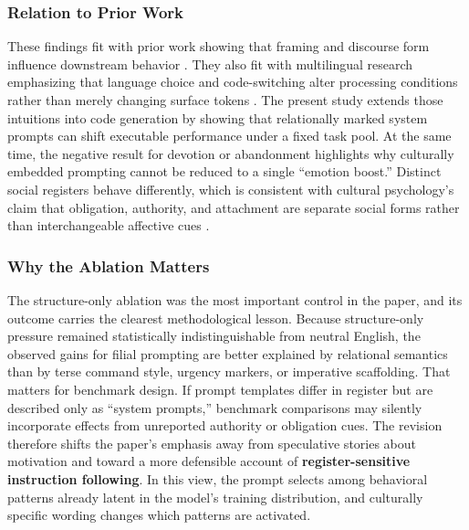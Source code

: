 \documentclass{article}
\begin{document}
\subsubsection{Relation to Prior Work}

\label{sec:relation_to_prior_work}

These findings fit with prior work showing that framing and discourse form influence downstream behavior \cite{liu2023nudging, perosanz2020narrative, tiffany2020gainloss}. They also fit with multilingual research emphasizing that language choice and code-switching alter processing conditions rather than merely changing surface tokens \cite{conneau2020emerging, qin2020cosdaml, zhang2023multilingual}. The present study extends those intuitions into code generation by showing that relationally marked system prompts can shift executable performance under a fixed task pool. At the same time, the negative result for devotion or abandonment highlights why culturally embedded prompting cannot be reduced to a single ``emotion boost.'' Distinct social registers behave differently, which is consistent with cultural psychology's claim that obligation, authority, and attachment are separate social forms rather than interchangeable affective cues \cite{kitayama2022varieties, li2021crosscultural, tang2022cultural}.

\subsubsection{Why the Ablation Matters}

\label{sec:why_the_ablation_matters}

The structure-only ablation was the most important control in the paper, and its outcome carries the clearest methodological lesson. Because structure-only pressure remained statistically indistinguishable from neutral English, the observed gains for filial prompting are better explained by relational semantics than by terse command style, urgency markers, or imperative scaffolding. That matters for benchmark design. If prompt templates differ in register but are described only as ``system prompts,'' benchmark comparisons may silently incorporate effects from unreported authority or obligation cues. The revision therefore shifts the paper's emphasis away from speculative stories about motivation and toward a more defensible account of \textbf{register-sensitive instruction following}. In this view, the prompt selects among behavioral patterns already latent in the model's training distribution, and culturally specific wording changes which patterns are activated.
\end{document}
